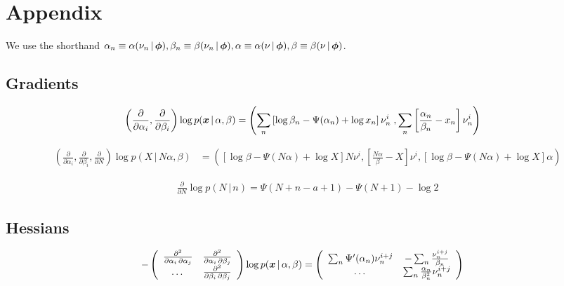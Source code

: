\documentclass[11pt]{article}
\newcommand{\cond}{\,|\,}
\newcommand{\firstDeriv}[1]{\frac{\partial}{\partial #1}}
\newcommand{\secPartial}[2]{\frac{\partial^2}{\partial #1 \, \partial #2}} %
\begin{document}
\section{Appendix} \label{sec:appendix}

We use the shorthand $\alpha_n \equiv \alpha(\nu_n \cond
\bmphi), \beta_n \equiv \beta(\nu_n \cond \bmphi), \alpha \equiv
\alpha(\nu \cond \bmphi), \beta \equiv \beta(\nu \cond \bmphi)$.

\subsection{Gradients} \label{sec:gradients}

\begin{align}
  \label{eq:grad-posterior}
  \left( \firstDeriv{\alpha_i}, \firstDeriv{\beta_i} \right) \log p(\bmx \cond \alpha, \beta) &=
  \left(
    \sum_n \left[ \log \beta_n - \Psi(\alpha_n) + \log x_n \right] \nu_n^i \;,
    \sum_n \left[ \frac{\alpha_n}{\beta_n} - x_n \right]\nu_n^i
  \right)
\end{align}

\begin{align}
  \label{eq:grad-prediction}
  \left( \firstDeriv{\alpha_i}, \firstDeriv{\beta_i}, \firstDeriv{N} \right) \log p(X \cond N \alpha, \beta)  &=
  \left(
    \left[ \log \beta - \Psi(N \alpha) + \log X \right] N \nu^i,
    \left[ \frac{N\alpha}{\beta} - X \right]\nu^i,
    \left[ \log \beta -\Psi(N \alpha) + \log X \right] \alpha
  \right)
\end{align}

\begin{align}
  \label{eq:grad-nb}
  \firstDeriv{N} \log p(N \cond n) = \Psi(N+n-a+1) - \Psi(N+1) - \log 2
\end{align}

\subsection{Hessians} \label{sec:hessians}

\begin{align}
  \label{eq:hess-posterior}
    - \left(
    \begin{array}{ccc}
      \secPartial{\alpha_i}{\alpha_j} & \secPartial{\alpha_i}{\beta_j}\\
      \dots & \secPartial{\beta_i}{\beta_j}
    \end{array}
  \right) \log p(\bmx \cond \alpha, \beta)
    &= \left(
    \begin{array}{cc}
      \sum_n \Psi'(\alpha_n) \nu_n^{i+j} & -\sum_n \frac{\nu_n^{i+j}}{\beta_n}\\
      \dots & \sum_n \frac{\alpha_n}{\beta_n^2} \nu_n^{i+j}
    \end{array}
  \right)
\end{align}
\end{document}
